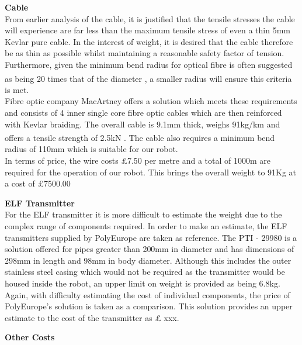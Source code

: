 \documentclass[11pt]{article}		%
\newcommand{\supercite}[1]{\textsuperscript{\cite{#1}}}		%
\begin{document}
			\textbf{Cable}\\
			From earlier analysis of the cable, it is justified that the tensile stresses the cable will experience are far less than the maximum tensile stress of even a thin 5mm Kevlar pure cable. In the interest of weight, it is desired that the cable therefore be as thin as possible whilst maintaining a reasonable safety factor of tension. Furthermore, given the minimum bend radius for optical fibre is often suggested as being 20 times that of the diameter \supercite{fibrebend}, a smaller radius will ensure this criteria is met.\\
	    	\hspace*{3ex}Fibre optic company MacArtney offers a solution which meets these requirements and consists of 4 inner single core fibre optic cables which are then reinforced with Kevlar braiding. The overall cable is 9.1mm thick, weighs 91kg/km and offers a tensile strength of 2.5kN \supercite{macartney}. The cable also requires a minimum bend radius of 110mm which is suitable for our robot. \\
	    	\hspace*{3ex}In terms of price, the wire costs £7.50 per metre and a total of 1000m are required for the operation of our robot. This brings the overall weight to 91Kg at a cost of £7500.00 
	
	        \textbf{ELF Transmitter}\\
	        For the ELF transmitter it is more difficult to estimate the weight due to the complex range of components required. In order to make an estimate, the ELF transmitters supplied by PolyEurope are taken as reference. The PTI - 29980 is a solution offered for pipes greater than 200mm in diameter and has dimensions of 298mm in length and 98mm in body diameter. Although this includes the outer stainless steel casing which would not be required as the transmitter would be housed inside the robot, an upper limit on weight is provided as being 6.8kg.\\
	        \hspace*{3ex}Again, with difficulty estimating the cost of individual components, the price of PolyEurope’s solution is taken as a comparison. This solution provides an upper estimate to the cost of the transmitter as £ xxx. 
	    
	        \textbf{Other Costs}\\
	
\end{document}
